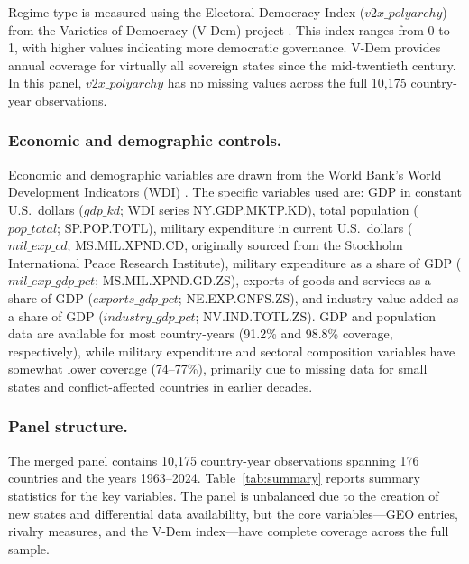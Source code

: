 \documentclass[11pt]{article}
\begin{document}
Regime type is measured using the Electoral Democracy Index ($v2x\_polyarchy$) from the Varieties of Democracy (V-Dem) project \cite{vdem2024,coppedge2024}. This index ranges from 0 to 1, with higher values indicating more democratic governance. V-Dem provides annual coverage for virtually all sovereign states since the mid-twentieth century. In this panel, $v2x\_polyarchy$ has no missing values across the full 10,175 country-year observations.

\subsubsection{Economic and demographic controls.}

Economic and demographic variables are drawn from the World Bank's World Development Indicators (WDI) \cite{worldbank2024}. The specific variables used are: GDP in constant U.S.\ dollars ($gdp\_kd$; WDI series NY.GDP.MKTP.KD), total population ($pop\_total$; SP.POP.TOTL), military expenditure in current U.S.\ dollars ($mil\_exp\_cd$; MS.MIL.XPND.CD, originally sourced from the Stockholm International Peace Research Institute), military expenditure as a share of GDP ($mil\_exp\_gdp\_pct$; MS.MIL.XPND.GD.ZS), exports of goods and services as a share of GDP ($exports\_gdp\_pct$; NE.EXP.GNFS.ZS), and industry value added as a share of GDP ($industry\_gdp\_pct$; NV.IND.TOTL.ZS). GDP and population data are available for most country-years (91.2\% and 98.8\% coverage, respectively), while military expenditure and sectoral composition variables have somewhat lower coverage (74--77\%), primarily due to missing data for small states and conflict-affected countries in earlier decades.

\subsubsection{Panel structure.}

The merged panel contains 10,175 country-year observations spanning 176 countries and the years 1963--2024. Table~\ref{tab:summary} reports summary statistics for the key variables. The panel is unbalanced due to the creation of new states and differential data availability, but the core variables---GEO entries, rivalry measures, and the V-Dem index---have complete coverage across the full sample.
\end{document}
